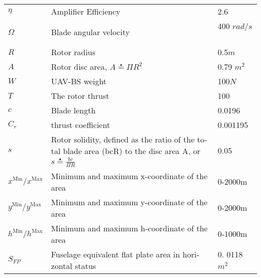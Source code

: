 \begin{table*}
\begin{adjustbox}{width=\columnwidth,center}
\begin{latin}
\begin{tabular}{|lll|}
\multicolumn{1}{|l|}{$\eta $}                      & \multicolumn{1}{l|}{Amplifier Efficiency}                     &  2.6\            \\ 


\multicolumn{1}{|l|}{$\Omega $}                      & \multicolumn{1}{l|}{Blade angular velocity}                     &      400 $rad/s$\           \\ 
\multicolumn{1}{|l|}{$R$}                      & \multicolumn{1}{l|}{Rotor radius}                     &       0.5$m$\          \\ 
\multicolumn{1}{|l|}{$A$}                      & \multicolumn{1}{l|}{Rotor disc area, $A\overset{\underset{\mathrm{\blacktriangle}}{}}{=}\Pi R_{}^{2}$}                     &       0.79 $m^{2}$\          \\ 
\multicolumn{1}{|l|}{$W$}                      & \multicolumn{1}{l|}{UAV-BS weight}                     &       100$N$\          \\ 
\multicolumn{1}{|l|}{$T$}                      & \multicolumn{1}{l|}{The rotor thrust}                     & 100                \\ 
\multicolumn{1}{|l|}{$c$}                      & \multicolumn{1}{l|}{Blade length}                     &        0.0196\         \\ 
\multicolumn{1}{|l|}{$C_{r}$}                      & \multicolumn{1}{l|}{thrust coefficient}                     &   0.001195              \\ 
\multicolumn{1}{|l|}{$s$}                      & \multicolumn{1}{l|}{Rotor solidity, defined as the ratio of the total blade area (bcR) to the disc area A, or $s\overset{\underset{\mathrm{\blacktriangle}}{}}{=}\frac{bc}{\Pi R}$}                     &        0.05\         \\ 
\multicolumn{1}{|l|}{$x_{}^{\mathrm{Min}}/x_{}^{\mathrm{Max}}$}                      & \multicolumn{1}{l|}{Minimum and maximum x-coordinate of the area}                     &            0-2000m\     \\ 
\multicolumn{1}{|l|}{$y_{}^{\mathrm{Min}}/y_{}^{\mathrm{Max}}$}                      & \multicolumn{1}{l|}{Minimum and maximum y-coordinate of the area}                     &         0-2000m\        \\ 
\multicolumn{1}{|l|}{$h_{}^{\mathrm{Min}}/h_{}^{\mathrm{Max}}$}                      & \multicolumn{1}{l|}{Minimum and maximum h-coordinate of the area}                     &          0-1000m\                   \\ 
\multicolumn{1}{|l|}{$S_{FP}$}                      & \multicolumn{1}{l|}{Fuselage equivalent flat plate area in horizontal status}                     &          0. 0118 $m^{2}$\       \\ 

\end{tabular}
\end{latin}
\end{adjustbox}
\end{table*}
